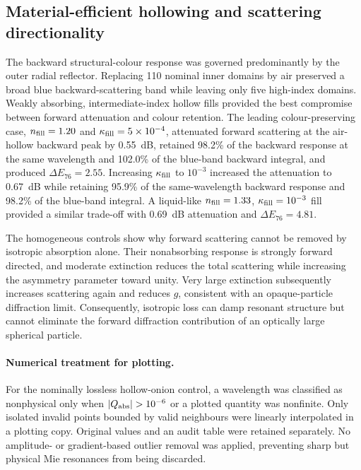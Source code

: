 \subsection{Material-efficient hollowing and scattering directionality}
\label{sec:hollowing_results}
The backward structural-colour response was governed predominantly by the outer
radial reflector. Replacing 110 nominal inner domains by air preserved a broad blue
backward-scattering band while leaving only five high-index domains. Weakly
absorbing, intermediate-index hollow fills provided the best compromise between
forward attenuation and colour retention. The leading colour-preserving case,
$n_{\rm fill}=1.20$ and $\kappa_{\rm fill}=5\times10^{-4}$, attenuated forward
scattering at the air-hollow backward peak by 0.55~dB, retained 98.2\% of the
backward response at the same wavelength and 102.0\% of the blue-band backward
integral, and produced $\Delta E_{76}=2.55$. Increasing $\kappa_{\rm fill}$ to
$10^{-3}$ increased the attenuation to 0.67~dB while retaining 95.9\% of the
same-wavelength backward response and 98.2\% of the blue-band integral. A
liquid-like $n_{\rm fill}=1.33$, $\kappa_{\rm fill}=10^{-3}$ fill provided a similar
trade-off with 0.69~dB attenuation and $\Delta E_{76}=4.81$.

The homogeneous controls show why forward scattering cannot be removed by isotropic
absorption alone. Their nonabsorbing response is strongly forward directed, and
moderate extinction reduces the total scattering while increasing the asymmetry
parameter toward unity. Very large extinction subsequently increases scattering
again and reduces $g$, consistent with an opaque-particle diffraction limit.
Consequently, isotropic loss can damp resonant structure but cannot eliminate the
forward diffraction contribution of an optically large spherical particle.

\paragraph{Numerical treatment for plotting.}
For the nominally lossless hollow-onion control, a wavelength was classified as
nonphysical only when $|Q_{\rm abs}|>10^{-6}$ or a plotted quantity was nonfinite.
Only isolated invalid points bounded by valid neighbours were linearly interpolated
in a plotting copy. Original values and an audit table were retained separately.
No amplitude- or gradient-based outlier removal was applied, preventing sharp but
physical Mie resonances from being discarded.

